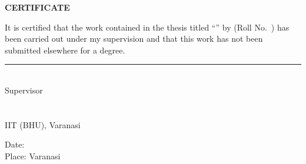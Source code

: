 {}
\thispagestyle{plain}
\begin{singlespace}

\vspace*{0.4cm}
\begin{center}
  {\large\bfseries CERTIFICATE}
\end{center}
\vspace{1.0cm}

It is certified that the work contained in the thesis titled
\enquote{\textbf{\thesistitle}} by \textbf{\thesisauthor}
(Roll No.~\thesisrollno) has been carried out under my supervision and that
this work has not been submitted elsewhere for a degree.

\vspace{2.0cm}
\begin{center}
  \rule{5cm}{0.4pt}\\
  Supervisor\\
  \textbf{\thesisguide}\\
  \thesisdepartment\\
  IIT (BHU), Varanasi
\end{center}

\vspace{1.5cm}
\noindent
Date:\\[0.3cm]
Place: Varanasi

\end{singlespace}
\clearpage
